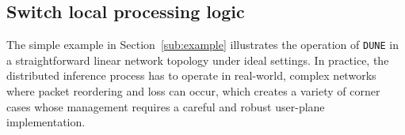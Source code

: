 \documentclass[journal]{IEEEtran}
\theoremstyle{plain} %
\newcommand{\name}{\texttt{\fontsize{9}{11}\selectfont DUNE}\xspace}
\begin{document}



\subsection{Switch local processing logic}
\label{sub:processing_logic}



The simple example in Section~\ref{sub:example} illustrates the operation of \name in a straightforward linear network topology under ideal settings. In practice, the distributed inference process has to operate in real-world, complex networks where packet reordering and loss can occur, which creates a variety of corner cases whose management requires a careful and robust user-plane implementation.
\end{document}
